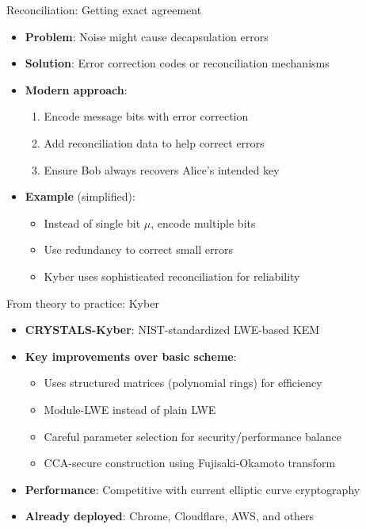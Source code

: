\documentclass[aspectratio=169, lualatex, handout]{beamer}
\begin{document}
\begin{frame}{Reconciliation: Getting exact agreement}
	\begin{itemize}
		\item \textbf{Problem}: Noise might cause decapsulation errors
		\item \textbf{Solution}: Error correction codes or reconciliation mechanisms
		\item \textbf{Modern approach}:
		      \begin{enumerate}
			      \item Encode message bits with error correction
			      \item Add reconciliation data to help correct errors
			      \item Ensure Bob always recovers Alice's intended key
		      \end{enumerate}
		\item \textbf{Example} (simplified):
		      \begin{itemize}
			      \item Instead of single bit $\mu$, encode multiple bits
			      \item Use redundancy to correct small errors
			      \item Kyber uses sophisticated reconciliation for reliability
		      \end{itemize}
	\end{itemize}
\end{frame}

\begin{frame}{From theory to practice: Kyber}
	\begin{itemize}
		\item \textbf{CRYSTALS-Kyber}: NIST-standardized LWE-based KEM
		\item \textbf{Key improvements over basic scheme}:
		      \begin{itemize}
			      \item Uses structured matrices (polynomial rings) for efficiency
			      \item Module-LWE instead of plain LWE
			      \item Careful parameter selection for security/performance balance
			      \item CCA-secure construction using Fujisaki-Okamoto transform
		      \end{itemize}
		\item \textbf{Performance}: Competitive with current elliptic curve cryptography
		\item \textbf{Already deployed}: Chrome, Cloudflare, AWS, and others
	\end{itemize}
\end{frame}
\end{document}
